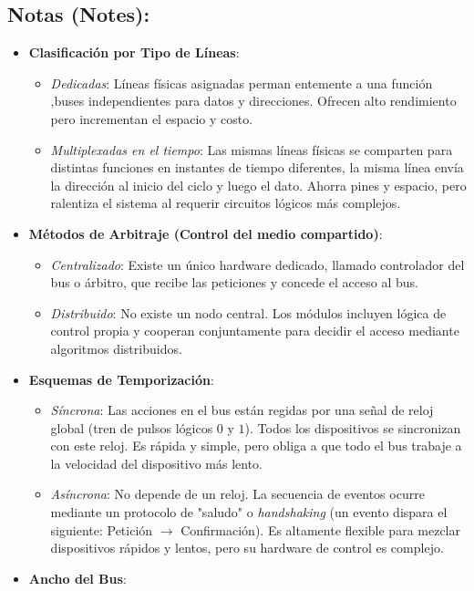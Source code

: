 \documentclass{article}
\begin{document}
\subsection{Notas (Notes):}
\label{sec:org2a77723}
\begin{itemize}
\item \textbf{Clasificación por Tipo de Líneas}:
\begin{itemize}
\item \emph{Dedicadas}: Líneas físicas asignadas perman
entemente a una función ,buses independientes para datos y
direcciones. Ofrecen alto rendimiento pero incrementan el espacio
y costo.
\item \emph{Multiplexadas en el tiempo}: Las mismas líneas físicas se
comparten para distintas funciones en instantes de tiempo
diferentes, la misma línea envía la dirección al inicio del
ciclo y luego el dato. Ahorra pines y espacio, pero ralentiza el
sistema al requerir circuitos lógicos más complejos.
\end{itemize}
\item \textbf{Métodos de Arbitraje (Control del medio compartido)}:
\begin{itemize}
\item \emph{Centralizado}: Existe un único hardware dedicado, llamado
controlador del bus o árbitro, que recibe las peticiones y concede
el acceso al bus.
\item \emph{Distribuido}: No existe un nodo central. Los módulos incluyen
lógica de control propia y cooperan conjuntamente para decidir el
acceso mediante algoritmos distribuidos.
\end{itemize}
\item \textbf{Esquemas de Temporización}:
\begin{itemize}
\item \emph{Síncrona}: Las acciones en el bus están regidas por una señal de
reloj global (tren de pulsos lógicos \(0\) y \(1\)). Todos los
dispositivos se sincronizan con este reloj. Es rápida y simple,
pero obliga a que todo el bus trabaje a la velocidad del
dispositivo más lento.
\item \emph{Asíncrona}: No depende de un reloj. La secuencia de eventos
ocurre mediante un protocolo de "saludo" o \emph{handshaking} (un
evento dispara el siguiente: Petición \(\rightarrow\)
Confirmación). Es altamente flexible para mezclar dispositivos
rápidos y lentos, pero su hardware de control es complejo.
\end{itemize}
\item \textbf{Ancho del Bus}:

\end{itemize}
\end{document}
